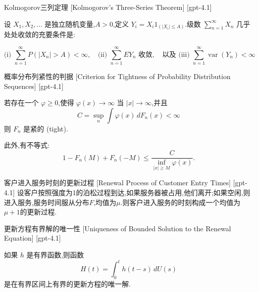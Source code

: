 \documentclass[UTF8]{ctexart}
\begin{document}
    
    
    \begin{thm}
        {Kolmogorov三列定理}
        [Kolmogorov's Three-Series Theorem]
        [gpt-4.1]
        
设 $X_{1}, X_{2}, \ldots$ 是独立随机变量,$A > 0$,定义 $Y_{i} = X_{i} 1_{(|X_{i}| \leq A)}$.级数 $\sum_{n=1}^{\infty} X_{n}$ 几乎处处收敛的充要条件是:

\[
\text{(i) } \sum_{n=1}^{\infty} P(|X_{n}| > A) < \infty, \quad \text{(ii) } \sum_{n=1}^{\infty} E Y_{n} \text{ 收敛}, \quad \text{以及 (iii) } \sum_{n=1}^{\infty} \operatorname{var}(Y_{n}) < \infty
\]

    \end{thm}
    
    
    
    \begin{thm}
        {概率分布列紧性的判据}
        [Criterion for Tightness of Probability Distribution Sequences]
        [gpt-4.1]
        
若存在一个 $\varphi \geq 0$,使得 $\varphi(x) \to \infty$ 当 $|x| \to \infty$,并且
\[
C = \sup_{n} \int \varphi(x)\, dF_{n}(x) < \infty
\]
则 $F_{n}$ 是紧的 (tight).

此外,有不等式:
\[
1 - F_{n}(M) + F_{n}(-M) \leq \frac{C}{\inf_{|x| \geq M} \varphi(x)}.
\]

    \end{thm}
    
    
    
    \begin{thm}
        {客户进入服务时刻的更新过程}
        [Renewal Process of Customer Entry Times]
        [gpt-4.1]
        设客户按照强度为1的泊松过程到达,如果服务器被占用,他们离开;如果空闲,则进入服务,服务时间服从分布$F$,均值为$\mu$.则客户进入服务的时刻构成一个均值为$\mu+1$的更新过程.
    \end{thm}
    
    
    
    \begin{thm}
        {更新方程有界解的唯一性}
        [Uniqueness of Bounded Solution to the Renewal Equation]
        [gpt-4.1]
        
如果 $h$ 是有界函数,则函数
\[
H ( t ) = \int _ { 0 } ^ { t } h ( t - s ) \, d U ( s )
\]
是在有界区间上有界的更新方程的唯一解.

    \end{thm}
    
\end{document}
